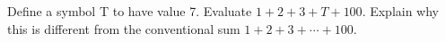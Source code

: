 Define a symbol T to have value 7. Evaluate $1+2+3+T+100$. Explain why this is different from the conventional sum $1+2+3+\cdots+100$.
